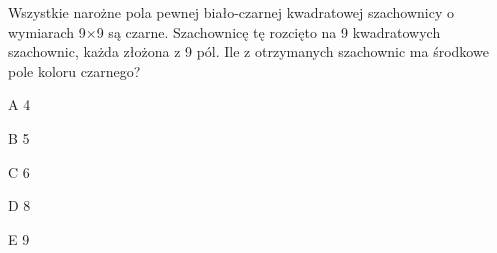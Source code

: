 \begin{tresc}
Wszystkie narożne pola pewnej biało-czarnej kwadratowej szachownicy o wymiarach 9×9 są czarne. Szachownicę tę rozcięto na 9 kwadratowych szachownic, każda złożona z 9 pól. Ile z otrzymanych szachownic ma środkowe pole koloru czarnego?
\end{tresc}
\begin{wariant}{A} 4 \end{wariant}
\begin{wariant}{B} 5 \end{wariant}
\begin{wariant}{C} 6 \end{wariant}
\begin{wariant}{D} 8 \end{wariant}
\begin{wariant}{E} 9 \end{wariant}
